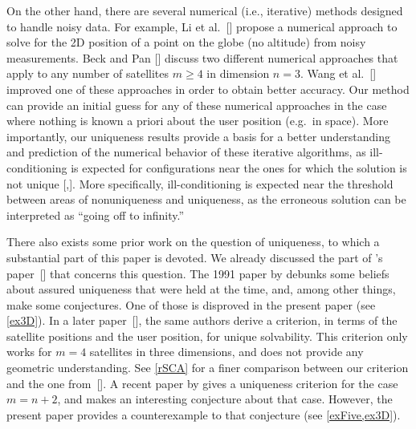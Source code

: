 \documentclass[reqno]{amsart}
\begin{document}
On the other hand, there are several numerical (i.e., iterative) methods designed to handle noisy data. For example,
Li et al.~[] propose a numerical approach to solve for the 2D position of a point on the globe (no altitude) from noisy measurements. Beck and Pan [] discuss two different numerical approaches that apply to any number of satellites $m\geq 4$ in dimension $n=3$. Wang et al.~[] improved one of these approaches in order to obtain better accuracy. 
Our method can provide an initial guess for any of these numerical approaches in the case where nothing is known a priori about the user position (e.g.~in space). More importantly, our uniqueness results provide a basis for a better understanding and prediction of the numerical behavior of these iterative algorithms, as ill-conditioning is expected for configurations near the ones for which the solution is not unique [,]. More specifically, ill-conditioning is expected near the threshold between areas of nonuniqueness and uniqueness, as the erroneous solution can be interpreted as ``going off to infinity.''

There also exists some prior work on the question of uniqueness, to which a substantial part of this paper is devoted. We already discussed the part of 's paper~[] that concerns this question. The 1991 paper by  debunks some beliefs about assured uniqueness that were held at the time, and, among other things, make some conjectures. One of those is disproved in the present paper (see \cref{ex3D}). In a later paper~[], the same authors derive a criterion, in terms of the satellite positions and the user position, for unique solvability. This criterion only works for $m = 4$ satellites in three dimensions, and does not provide any geometric understanding. See \cref{rSCA} for a finer comparison between our criterion and the one from~[]. A recent paper by  gives a uniqueness criterion for the case $m = n + 2$, and makes an interesting conjecture about that case. However, the present paper provides a counterexample to that conjecture (see \cref{exFive,ex3D}).
\end{document}
